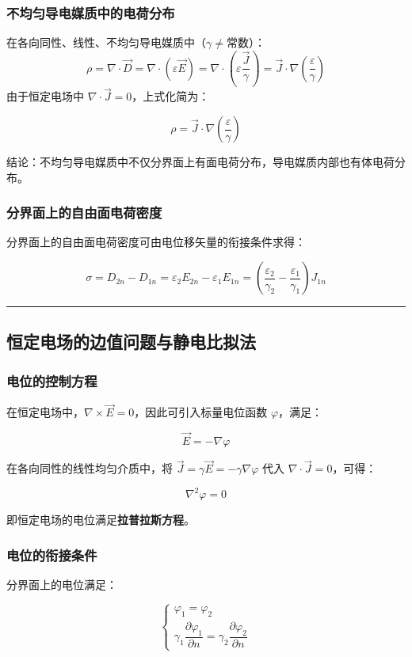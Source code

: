 \subsubsection{不均匀导电媒质中的电荷分布}
在各向同性、线性、不均匀导电媒质中（$\gamma \neq \text{常数}$）：
\[
\rho = \nabla \cdot \vec{D} = \nabla \cdot (\varepsilon \vec{E}) = \nabla \cdot \left( \varepsilon \frac{\vec{J}}{\gamma} \right) = \vec{J} \cdot \nabla \left( \frac{\varepsilon}{\gamma} \right)
\]
由于恒定电场中 $\nabla \cdot \vec{J} = 0$，上式化简为：
\begin{formulaBox}
\[
\rho = \vec{J} \cdot \nabla \left( \frac{\varepsilon}{\gamma} \right)
\]
\end{formulaBox}
结论：不均匀导电媒质中不仅分界面上有面电荷分布，导电媒质内部也有体电荷分布。

\subsubsection{分界面上的自由面电荷密度}
分界面上的自由面电荷密度可由电位移矢量的衔接条件求得：
\begin{formulaBox}
\[
\sigma = D_{2n} - D_{1n} = \varepsilon_2 E_{2n} - \varepsilon_1 E_{1n} = \left( \frac{\varepsilon_2}{\gamma_2} - \frac{\varepsilon_1}{\gamma_1} \right) J_{1n}
\]
\end{formulaBox}

\vspace{0.8cm}\hrule\vspace{0.8cm}

\subsection{恒定电场的边值问题与静电比拟法}
\subsubsection{电位的控制方程}
在恒定电场中，$\nabla \times \vec{E} = 0$，因此可引入标量电位函数 $\varphi$，满足：
\begin{formulaBox}
\[
\vec{E} = -\nabla\varphi
\]
\end{formulaBox}
在各向同性的线性均匀介质中，将 $\vec{J} = \gamma \vec{E} = -\gamma \nabla\varphi$ 代入 $\nabla \cdot \vec{J} = 0$，可得：
\begin{formulaBox}
\[
\nabla^2 \varphi = 0
\]
\end{formulaBox}
即恒定电场的电位满足\textbf{拉普拉斯方程}。

\subsubsection{电位的衔接条件}
分界面上的电位满足：
\begin{formulaBox}
\[
\begin{cases}
\varphi_1 = \varphi_2 \\
\gamma_1 \dfrac{\partial \varphi_1}{\partial n} = \gamma_2 \dfrac{\partial \varphi_2}{\partial n}
\end{cases}
\]
\end{formulaBox}

